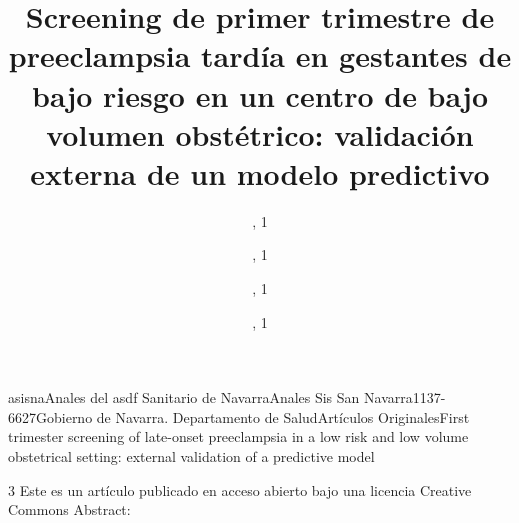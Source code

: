 \documentclass{article}
\begin{document}
\title{Screening de primer trimestre de preeclampsia tardía en gestantes de
bajo riesgo en un centro de bajo volumen obstétrico: validación externa de un
modelo predictivo}
\author[]{,
1}
\author[]{,
1}
\author[]{,
1}
\author[]{,
1}\affil[aff1]{}

\maketitle

asisnaAnales del asdf Sanitario de NavarraAnales Sis San
Navarra1137-6627Gobierno de Navarra. Departamento de SaludArtículos
OriginalesFirst trimester screening of late-onset preeclampsia in a low risk
and low volume obstetrical setting: external validation of a predictive
model\date{}{}{}
\newcommand{\volume}{38}
3\newcommand{\fpage}{387}
\newcommand{\lpage}{396}
Este es un artículo publicado en acceso abierto bajo una licencia
Creative Commons
Abstract:\section{}

\section{}

\section{}

\section{}
\end{document}
